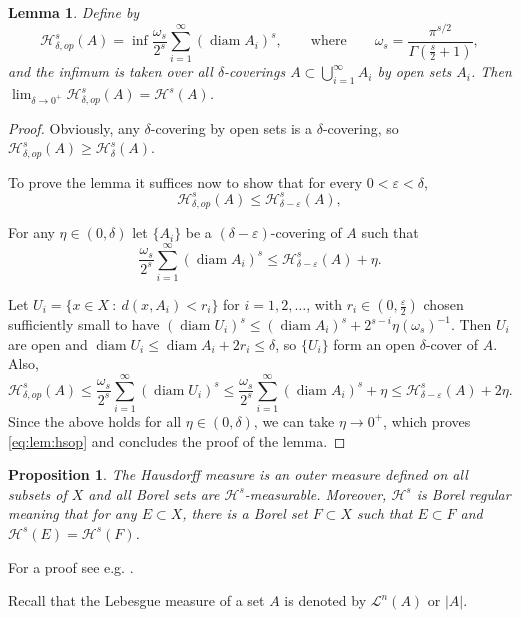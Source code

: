 \documentclass[12pt,leqno]{amsart}
\newtheorem{lemma}[theorem]{Lemma}
\newtheorem{proposition}[theorem]{Proposition}
\theoremstyle{definition}
\newcommand{\eps}{\varepsilon}
\def\diam{\operatorname{diam}}
\def\H{{\mathcal H}}
\def\LL{{\mathcal L}}
\numberwithin{theorem}{section} \numberwithin{equation}{section}
\begin{document}
\begin{lemma}\label{lem:hsop}
    Define by $$
\H^s_{\delta,op} (A)
= \inf \frac{\omega_s}{2^s}\sum_{i=1}^\infty (\diam A_i)^s,
\qquad
\text{where}
\qquad
\omega_s=\frac{\pi^{s/2}}{\Gamma(\tfrac{s}{2}+1)},
$$
and the infimum is taken over all $\delta$-coverings $A\subset\bigcup_{i=1}^\infty A_i$ by \emph{open} sets $A_i$. Then $\lim_{\delta\to 0^+} \H^s_{\delta,op}(A)=\H^s(A)$.
\end{lemma}
\begin{proof}
    Obviously, any $\delta$-covering by open sets is a $\delta$-covering, so $\H^s_{\delta,op} (A) \geq \H^s_{\delta} (A)$.

    To prove the lemma it suffices now to show that for every $0<\varepsilon<\delta$,
    \begin{equation}\label{eq:lem:hsop}
        \mathcal H^{s}_{\delta,op}(A) \leq \mathcal H^s_{\delta-\varepsilon}(A),
    \end{equation}

    For any $\eta\in(0,\delta)$ let $\{A_i\}$ be a $(\delta-\eps)$-covering of $A$ such that
    $$
    \frac{\omega_s}{2^s} \sum_{i=1}^\infty(\diam A_i)^s\leq \H^s_{\delta-\eps}(A)+\eta.
    $$

    Let $U_i=\{x\in X~:~d(x,A_i)<r_i\}$ for $i=1,2,\ldots$, with $r_i\in(0,\frac{\eps}{2})$ chosen sufficiently small to have $(\diam U_i)^s\leq (\diam A_i)^s+2^{s-i}\eta (\omega_s)^{-1}$. Then $U_i$ are open and  ${\diam U_i\leq \diam A_i+2r_i\leq \delta}$, so $\{U_i\}$ form an open $\delta$-cover of $A$. Also,
    $$
\H^s_{\delta,op}(A)\leq \frac{\omega_s}{2^s}\sum_{i=1}^\infty (\diam U_i)^s\leq \frac{\omega_s}{2^s}\sum_{i=1}^\infty (\diam A_i)^s+\eta\leq \H^s_{\delta-\eps}(A)+2\eta.
    $$
Since the above holds for all $\eta\in(0,\delta)$, we can take $\eta\to 0^+$, which proves \eqref{eq:lem:hsop} and concludes the proof of the lemma.
\end{proof}




\begin{proposition}
\label{AT2}
The Hausdorff measure is an outer measure defined on all subsets of $X$ and all
Borel sets are $\H^s$-measurable. Moreover, $\H^s$ is Borel regular meaning that for any $E\subset X$, there is a Borel set $F\subset X$ such that $E\subset F$ and $\H^s(E)=\H^s(F)$.
\end{proposition}
For a proof see e.g. \cite[Lemma~2.10]{EH1}.

Recall that the Lebesgue measure of a set $A$ is denoted by $\LL^n(A)$ or $|A|$.
\end{document}

